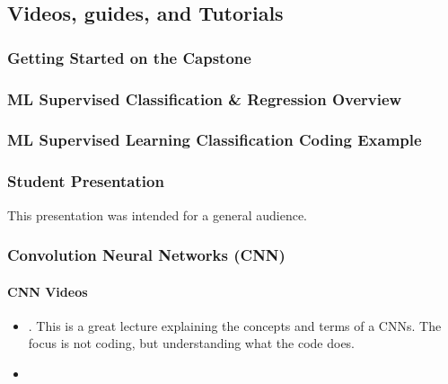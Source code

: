 \documentclass[letterpaper,10pt,english]{jupyterBook}
\begin{document}
\subsection{Videos, guides, and Tutorials}
\label{\detokenize{resources:videos-guides-and-tutorials}}\label{\detokenize{resources:resources-task2-videos}}

\subsubsection{Getting Started on the Capstone}
\label{\detokenize{resources:getting-started-on-the-capstone}}\label{\detokenize{resources:resources-task2c-videos-ml-sup-reg-class}}



\subsubsection{ML Supervised Classification \& Regression Overview}
\label{\detokenize{resources:ml-supervised-classification-regression-overview}}



\subsubsection{ML Supervised Learning Classification Coding Example}
\label{\detokenize{resources:ml-supervised-learning-classification-coding-example}}\label{\detokenize{resources:resources-task2c-videos-ml-sup-class-code}}



\subsubsection{Student Presentation}
\label{\detokenize{resources:student-presentation}}


\sphinxAtStartPar
This presentation was intended for a general audience.


\subsubsection{Convolution Neural Networks (CNN)}
\label{\detokenize{resources:convolution-neural-networks-cnn}}

\paragraph{CNN Videos}
\label{\detokenize{resources:cnn-videos}}\begin{itemize}
\item {} 
\sphinxAtStartPar
{}. This is a great lecture explaining the concepts and terms of a CNNs. The focus is not coding, but understanding what the code does.

\item {} 
\sphinxAtStartPar
{}

\end{itemize}
\end{document}
